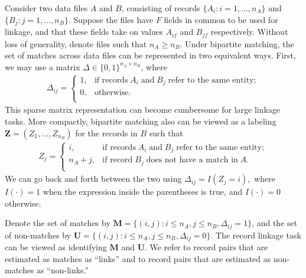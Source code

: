 \documentclass[ba]{imsart}
\begin{document}
Consider two data files $A$ and $B$, consisting of records $\{A_i: i = 1, \ldots, n_A\}$ and $\{B_j: j = 1, \ldots, n_B\}$. Suppose the files have $F$ fields in common to be used for linkage, and that these fields take on values $A_{if}$ and $B_{jf}$ respectively. Without loss of generality, denote files such that $n_A \geq n_B$. Under bipartite matching, the set of matches across data files can be represented in two equivalent ways. First, we may use a matrix $\Delta \in \{0, 1\}^{n_A \times n_B}$, where
\begin{align}
	\Delta_{ij} =
	\begin{cases}
		1, & \text{if records}\;  A_i \; \text{and}\; B_j \; \text{refer to the same entity}; \\
		0, & \text{otherwise}.\\
	\end{cases}
\end{align}
This sparse matrix representation can become cumbersome for large linkage tasks. More compactly, bipartite matching also can be viewed as a labeling $\bm{Z} = (Z_1, \ldots, Z_{n_B})$ for the records in $B$ such that 
\begin{align}
	Z_{j} =
	\begin{cases}
		i, & \text{if records}\;  A_i \; \text{and}\; B_j  \; \text{refer to the same entity}; \\
		n_A + j, & \text{if record}\;  B_j \; \text{does not have a match in}\; A. \\
	\end{cases}
\end{align}
We can go back and forth between the two using $\Delta_{ij} = I(Z_j = i),$ where $I(\cdot) = 1$ when the expression inside the parentheses is true, and $I(\cdot) = 0$ otherwise. 

Denote the set of matches by $\bm{M} = \{(i,j): i \leq n_A, j \leq n_B, \Delta_{ij} = 1\}$, and the set of non-matches by 
$\bm{U} =  \{(i,j): i \leq n_A, j \leq n_B, \Delta_{ij} = 0\}.$ The record linkage task can be viewed as identifying  $\bm{M}$ and  $\bm{U}.$ We refer to record pairs that are estimated as matches as ``links'' and to record pairs that are estimated as non-matches as ``non-links.''

\end{document}
